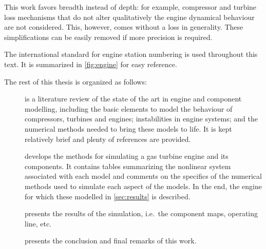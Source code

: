 \documentclass[tcc]{subfiles}
\begin{document}
This work favors breadth instead of depth: 
for example, compressor and turbine loss mechanisms that do not alter qualitatively the engine dynamical behaviour are not considered. 
This, however, comes without a loss in generality. 
These simplifications can be easily removed if more precision is required.

The international standard for engine station numbering \cite{ARP755A} is used throughout this text. 
It is summarized in \cref{fig:engine} for easy reference.

The rest of this thesis is organized as follows: 
\begin{description}
    \item[] is a literature review of the state of the art in engine and component modelling, 
        including the basic elements to model the behaviour of compressors, turbines and engines; 
        instabilities in engine systems; and the numerical methods needed to bring these models to life. 
        It is kept relatively brief and plenty of references are provided.
    \item[] develops the methods for simulating a gas turbine engine and its components. 
        It contains tables summarizing the nonlinear system associated with each model 
        and comments on the specifics of the numerical methods used to simulate each aspect of the models. 
        In the end, the engine for which these modelled in \cref{sec:results} is described.
    \item[] presents the results of the simulation, i.e.\ the component maps, operating line, etc.
    \item[] presents the conclusion and final remarks of this work.
\end{description}
\end{document}
